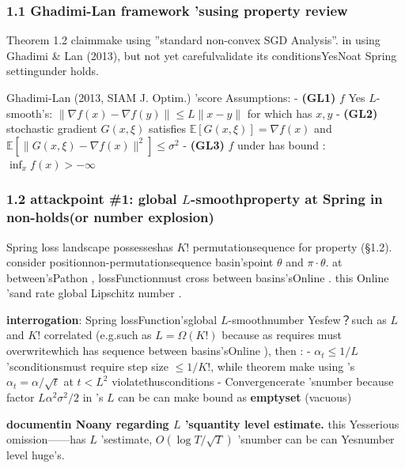 \documentclass[
  12pt,
]{article}
\begin{document}
\subsubsection{1.1 Ghadimi-Lan
framework 'susing property review}\label{ghadimi-lan-ux6846ux67b6ux7684ux9002ux7528ux6027ux5ba1ux67e5}

Theorem 1.2 claimmake using ''standard non-convex SGD Analysis''. in using  Ghadimi \& Lan
(2013), but not yet carefulvalidate its conditionsYesNoat  Spring settingunder holds. 

Ghadimi-Lan (2013, SIAM J. Optim.) 'score Assumptions:  - \textbf{(GL1)} \(f\)
Yes \(L\)-smooth's: \(\|\nabla f(x) - \nabla f(y)\| \leq L\|x - y\|\)
for which has  \(x, y\) - \textbf{(GL2)} stochastic gradient \(G(x, \xi)\) satisfies 
\(\mathbb{E}[G(x,\xi)] = \nabla f(x)\) and 
\(\mathbb{E}[\|G(x,\xi) - \nabla f(x)\|^2] \leq \sigma^2\) -
\textbf{(GL3)} \(f\) under has bound : \(\inf_x f(x) > -\infty\)

\subsubsection{\texorpdfstring{1.2 attackpoint  \#1: global  \(L\)-smoothproperty at 
Spring
in non-holds(or number explosion)}{1.2 attackpoint  \#1: global  L-smoothproperty at  Spring in non-holds(or number explosion)}}\label{ux653bux51fbux70b9-1ux5168ux5c40-l-ux5149ux6ed1ux6027ux5728-spring-ux4e2dux4e0dux6210ux7acbux6216ux5e38ux6570ux7206ux70b8}

Spring loss landscape possesseshas  \(K!\)
permutationsequence for property (§1.2). consider positionnon-permutationsequence basin'spoint  \(\theta\) and 
\(\pi \cdot \theta\). at between'sPathon , lossFunctionmust cross between basins'sOnline . this Online 'sand rate global 
Lipschitz number . 

\textbf{interrogation}: Spring lossFunction'sglobal  \(L\)-smoothnumber Yesfew？such as  \(L\) and 
\(K!\) correlated (e.g.such as  \(L = \Omega(K!)\)
because as requires must overwritewhich has sequence between basins'sOnline ), then :  - \(\alpha_t \leq 1/L\)
'sconditionsmust require step size \(\leq 1/K!\), while theorem make using 's
\(\alpha_t = \alpha/\sqrt{t}\) at  \(t < L^2\) violatethusconditions -
Convergencerate 'snumber because factor  \(L\alpha^2\sigma^2/2\) in 's \(L\)
can be can make bound as \textbf{emptyset }(vacuous)

\textbf{documentin Noany regarding  \(L\) 'squantity level estimate. } this Yesserious omission------has 
\(L\) 'sestimate, \(O(\log T/\sqrt{T})\) 'snumber can be can Yesnumber level huge's. 
\end{document}

